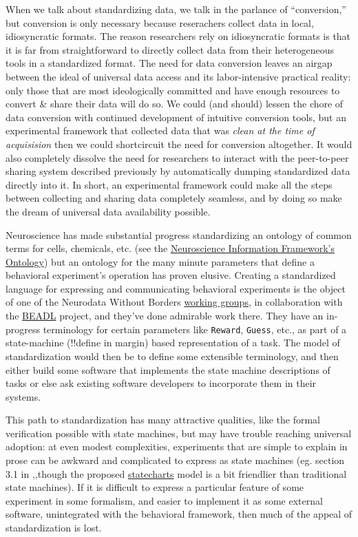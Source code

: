 \documentclass{article}
\begin{document}
When we talk about standardizing data, we talk in the parlance of
``conversion,'' but conversion is only necessary because reserachers
collect data in local, idiosyncratic formats. The reason researchers
rely on idiosyncratic formats is that it is far from straightforward to
directly collect data from their heterogeneous tools in a standardized
format. The need for data conversion leaves an airgap between the ideal
of universal data access and its labor-intensive practical reality: only
those that are most ideologically committed and have enough resources to
convert \& share their data will do so. We could (and should) lessen the
chore of data conversion with continued development of intuitive
conversion tools, but an experimental framework that collected data that
was \emph{clean at the time of acquisision} then we could shortcircuit
the need for conversion altogether. It would also completely dissolve
the need for researchers to interact with the peer-to-peer sharing
system described previously by automatically dumping standardized data
directly into it. In short, an experimental framework could make all the
steps between collecting and sharing data completely seamless, and by
doing so make the dream of universal data availability possible.

Neuroscience has made substantial progress standardizing an ontology of
common terms for cells, chemicals, etc. (see the
\href{https://github.com/SciCrunch/NIF-Ontology}{Neuroscience
Information Framework's Ontology}) but an ontology for the many minute
parameters that define a behavioral experiment's operation has proven
elusive. Creating a standardized language for expressing and
communicating behavioral experiments is the object of one of the
Neurodata Without Borders
\href{https://archive.org/details/nwb-behavioral-task-wg}{working
groups}, in collaboration with the
\href{https://archive.org/details/beadl-xml-documentation-v-0.1}{BEADL}
project, and they've done admirable work there. They have an in-progress
terminology for certain parameters like \texttt{Reward}, \texttt{Guess},
etc., as part of a state-machine (!!define in margin) based
representation of a task. The model of standardization would then be to
define some extensible terminology, and then either build some software
that implements the state machine descriptions of tasks or else ask
existing software developers to incorporate them in their systems.

This path to standardization has many attractive qualities, like the
formal verification possible with state machines, but may have trouble
reaching universal adoption: at even modest complexities, experiments
that are simple to explain in prose can be awkward and complicated to
express as state machines (eg. section 3.1 in \cite{saundersAutopilotAutomatingBehavioral2019},,though the proposed
\href{https://statecharts.github.io/}{statecharts} model is a bit
friendlier than traditional state machines). If it is difficult to
express a particular feature of some experiment in some formalism, and
easier to implement it as some external software, unintegrated with the
behavioral framework, then much of the appeal of standardization is
lost.
\end{document}
